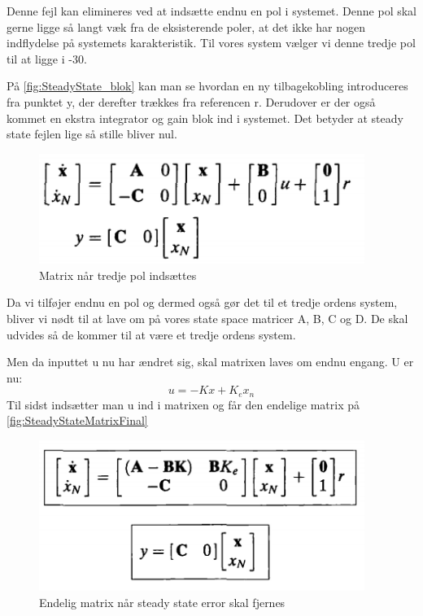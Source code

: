 Denne fejl kan elimineres ved at indsætte endnu en pol i systemet. Denne pol skal gerne ligge så langt væk fra de eksisterende poler, at det ikke har nogen indflydelse på systemets karakteristik. Til vores system vælger vi denne tredje pol til at ligge i -30.

På \autoref{fig:SteadyState_blok} kan man se hvordan en ny tilbagekobling introduceres fra punktet y, der derefter trækkes fra referencen r. Derudover er der også kommet en ekstra integrator og gain blok ind i systemet. Det betyder at steady state fejlen lige så stille bliver nul. 

\begin{figure}[H]
	\centering
	\includegraphics[width = 300pt]{Img/SteadyState_matrix.png}
	\caption{Matrix når tredje pol indsættes}
	\label{fig:SteadyStateMatrix}
\end{figure}

Da vi tilføjer endnu en pol og dermed også gør det til et tredje ordens system, bliver vi nødt til at lave om på vores state space matricer A, B, C og D. De skal udvides så de kommer til at være et tredje ordens system.

Men da inputtet u nu har ændret sig, skal matrixen laves om endnu engang. U er nu:
\begin{equation}
u=-Kx+K_ex_n
\end{equation}
Til sidst indsætter man u ind i matrixen og får den endelige matrix på \autoref{fig:SteadyStateMatrixFinal}

\begin{figure}[H]
	\centering
	\includegraphics[width = 300pt]{Img/SteadyState_matrix_final.png}
	\caption{Endelig matrix når steady state error skal fjernes}
	\label{fig:SteadyStateMatrixFinal}
\end{figure}

